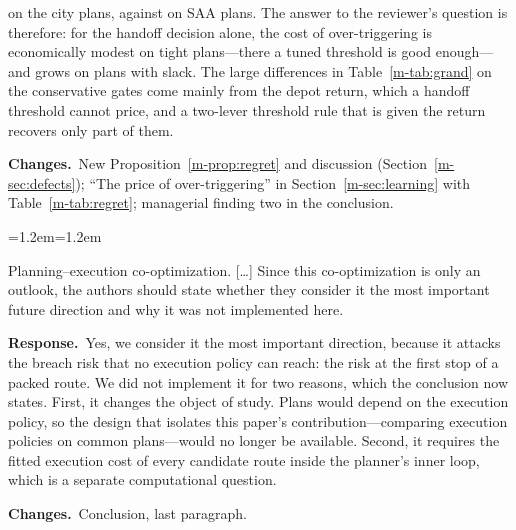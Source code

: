 \documentclass[11pt]{article}
\newenvironment{comment}{\par\medskip\noindent\color{rev}\itshape
  \begin{list}{}{\leftmargin=1.2em\rightmargin=1.2em}\item[]}%
  {\end{list}\par}
\newcommand{\resp}{\par\noindent\textbf{Response.}\ }
\newcommand{\chg}{\par\noindent\textbf{Changes.}\ }
\newcommand{\sref}[1]{Section~\ref{m-#1}}
\newcommand{\tref}[1]{Table~\ref{m-#1}}
\begin{document}
\thrGapCity{} on the city plans, against \thrGapSaa{} on \textsc{SAA}
plans. The answer to the reviewer's question is therefore: for the
handoff decision alone, the cost of over-triggering is economically
modest on tight plans---there a tuned threshold is good enough---and
grows on plans with slack. The large differences in \tref{tab:grand} on
the conservative gates come mainly from the depot return, which a
handoff threshold cannot price, and a two-lever threshold rule that is
given the return recovers only part of them.
\chg New Proposition~\ref{m-prop:regret} and discussion
(\sref{sec:defects}); ``The price of over-triggering'' in
\sref{sec:learning} with \tref{tab:regret}; managerial finding two in the
conclusion.

\begin{comment}
Planning--execution co-optimization. [\ldots] Since this
co-optimization is only an outlook, the authors should state whether
they consider it the most important future direction and why it was not
implemented here.
\end{comment}
\resp Yes, we consider it the most important direction, because it
attacks the breach risk that no execution policy can reach: the risk at
the first stop of a packed route. We did not implement it for two
reasons, which the conclusion now states. First, it changes the object
of study. Plans would depend on the execution policy, so the design
that isolates this paper's contribution---comparing execution policies
on common plans---would no longer be available. Second, it requires the
fitted execution cost of every candidate route inside the planner's
inner loop, which is a separate computational question.
\chg Conclusion, last paragraph.
\end{document}
